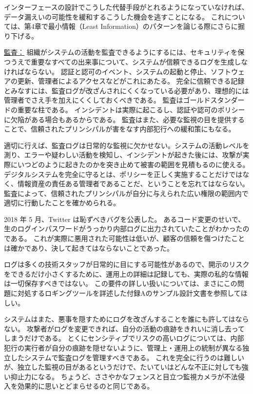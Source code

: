 \documentclass[uplatex]{jsarticle}
\def\label#1{}%
\begin{document}
インターフェースの設計でこうした代替手段がとれるようになっていなければ、データ漏えいの可能性を緩和するこうした機会を逃すことになる。
これについては、第4章で最小情報（Least Information）のパターンを論じる際にさらに掘り下げる。

\underline{監査：}
組織がシステムの活動を監査できるようにするには、セキュリティを保つうえで重要なすべての出来事について、システムが信頼できるログを生成しなければならない。
認証と認可のイベント、システムの起動と停止、ソフトウェアの更新、管理者によるアクセスなどがこれにあたる。
完全に信頼できる記録とみなすには、監査ログが改ざんされにくくなっている必要があり、理想的には管理者でさえ手を加えにくくしておくべきである。
監査はゴールドスタンダードの重要な柱である。
インシデントは実際に起こるし、認証や認可のポリシーに欠陥がある場合もあるからである。
監査はまた、必要な監視の目を提供することで、信頼されたプリンシパルが害をなす内部犯行への緩和策にもなる。

適切に行えば、監査ログは日常的な監視に欠かせない。システムの活動レベルを測り、エラーや疑わしい活動を検知し、インシデントが起きた後には、攻撃が実際にいつどのように起きたのかを突き止めて被害の範囲を見積もるのに使える。
デジタルシステムを完全に守るとは、ポリシーを正しく実施することだけではなく、情報資産の責任ある管理者であることだ、ということを忘れてはならない。
監査によって、信頼されたプリンシパルが自分に与えられた広い権限の範囲内で適切に行動したことを確かめられる。

\begin{exa}\label{exa:ch1-twitter-password-log}
2018 年 5 月、Twitter は恥ずべきバグを公表した。
あるコード変更のせいで、生のログインパスワードがうっかり内部ログに出力されていたことがわかったのである。
これが実際に悪用された可能性は低いが、顧客の信頼を傷つけたことは確かであり、決して起きてはならないことであった。
\end{exa}

ログは多くの技術スタッフが日常的に目にする可能性があるので、開示のリスクをできるだけ小さくするために、運用上の詳細は記録しても、実際の私的な情報は一切保存すべきではない。
この要件の詳しい扱いについては、まさにこの問題に対処するロギングツールを詳述した付録Aのサンプル設計文書を参照してほしい。

システムはまた、悪事を隠すためにログを改ざんすることを誰にも許してはならない。
攻撃者がログを変更できれば、自分の活動の痕跡をきれいに消し去ってしまうだけである。
とくにセンシティブでリスクの高いログについては、内部犯行の実行者が自分の痕跡を隠せないように、管理上・運用上の統制が異なる独立したシステムで監査ログを管理すべきである。
これを完全に行うのは難しいが、独立した監視の目があるというだけで、たいていはどんな不正に対しても強い抑止力になる。
ちょうど、ささやかなフェンスと目立つ監視カメラが不法侵入を効果的に思いとどまらせるのと同じである。
\end{document}
